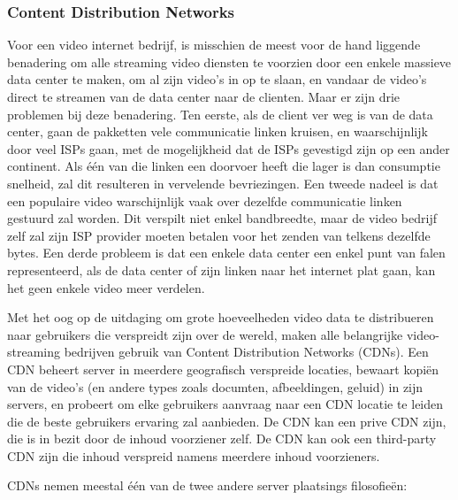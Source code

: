 \clearpage

\subsubsection{Content Distribution Networks}

Voor een video internet bedrijf, is misschien de meest voor de hand liggende benadering om alle streaming video diensten te voorzien door een enkele massieve data center te maken, om al zijn video’s in op te slaan, en vandaar de video’s direct te streamen van de data center naar de clienten. Maar er zijn drie problemen bij deze benadering.
Ten eerste, als de client ver weg is van de data  center, gaan de pakketten vele communicatie linken kruisen, en waarschijnlijk door veel ISPs gaan, met de mogelijkheid dat de ISPs gevestigd zijn op een ander continent. Als één van die linken een doorvoer heeft die lager is dan consumptie snelheid, zal dit resulteren in vervelende bevriezingen.
Een tweede nadeel is dat een populaire video warschijnlijk vaak over dezelfde communicatie linken gestuurd zal worden. Dit verspilt niet enkel bandbreedte, maar de video bedrijf zelf zal zijn ISP provider moeten betalen voor het zenden van telkens dezelfde bytes.
Een derde probleem is dat een enkele data center een enkel punt van falen representeerd, als de data center of zijn linken naar het internet plat gaan, kan het geen enkele video meer verdelen.

Met het oog op de uitdaging om grote hoeveelheden video data te distribueren naar gebruikers die verspreidt zijn over de wereld, maken alle belangrijke video-streaming bedrijven gebruik van Content Distribution Networks (CDNs). Een CDN beheert server in meerdere geografisch verspreide locaties, bewaart kopiën van de video’s (en andere types zoals documten, afbeeldingen, geluid) in zijn servers, en probeert om elke gebruikers aanvraag naar een CDN locatie te leiden die de beste gebruikers ervaring zal aanbieden. De CDN kan een prive CDN zijn, die is in bezit door de inhoud voorziener zelf. De CDN kan ook een third-party CDN zijn die inhoud verspreid namens meerdere inhoud voorzieners.

CDNs nemen meestal één van de twee andere server plaatsings filosofieën:

